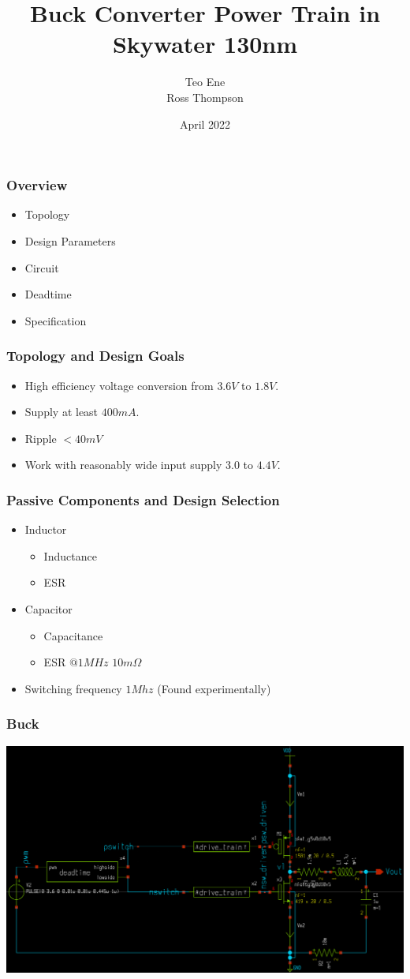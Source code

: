 \documentclass{beamer}
\title{Buck Converter Power Train in Skywater 130nm}
\author{Teo Ene \\
  Ross Thompson}
\institute{Oklahoma State University}
\date{April 2022}
\begin{document}
\frame{\titlepage}

\begin{frame}
  \frametitle{Overview}
  \begin{itemize}
  \item Topology
  \item Design Parameters
  \item Circuit
  \item Deadtime
  \item Specification
  \end{itemize}
\end{frame}

\begin{frame}
  \frametitle{Topology and Design Goals}
  \begin{itemize}
  \item High efficiency voltage conversion from $3.6V$ to $1.8V$.
  \item Supply at least $400mA$.
  \item Ripple $< 40mV$
  \item Work with reasonably wide input supply $3.0$ to $4.4V$.
  \end{itemize}        
\end{frame}

\begin{frame}
  \frametitle{Passive Components and Design Selection}
  \begin{itemize}
  \item Inductor
    \begin{itemize}
    \item Inductance
    \item ESR
    \end{itemize}
  \item Capacitor
    \begin{itemize}
    \item Capacitance
    \item ESR $@ 1MHz$ $10 m\Omega$
    \end{itemize}
  \item Switching frequency $1Mhz$ (Found experimentally)
  \end{itemize}
\end{frame}

\begin{frame}
  \frametitle{Buck}
  \includegraphics[scale=0.08]{buck.png}
\end{frame}
\end{document}
